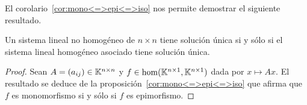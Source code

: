%
%
%
%

\begin{block}
	\label{cor:Ax=0<=>Ax=b}
	El corolario~\ref{cor:mono<=>epi<=>iso} nos permite demostrar el siguiente
	resultado.

	\begin{cor*}
		Un sistema lineal no homogéneo de $n\times n$ tiene solución única si y
		sólo si el sistema lineal homogéneo asociado tiene solución única.

		\begin{proof}
			Sean $A=(a_{ij})\in\mathbb{K}^{n\times n}$ y
			$f\in\hom(\mathbb{K}^{n\times1},\mathbb{K}^{n\times1})$ dada por $x\mapsto Ax$.  El
			resultado se deduce de la proposición~\ref{cor:mono<=>epi<=>iso}
			que afirma que $f$ es monomorfismo si y sólo si $f$ es epimorfismo.
		\end{proof}
	\end{cor*}
\end{block}

